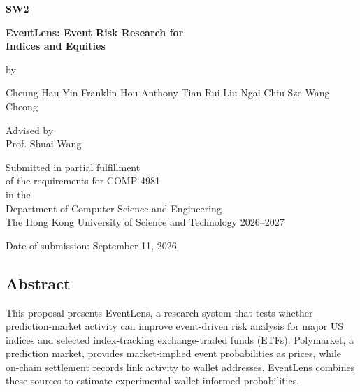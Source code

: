 \thispagestyle{empty}
\vspace*{\fill}
\begin{center}
{\fontsize{40}{48}\selectfont\bfseries SW2\par}
\end{center}
\vspace*{\fill}

\clearpage
\thispagestyle{empty}
\begin{center}
{\Huge\bfseries EventLens: Event Risk Research for\\[6pt] Indices and Equities\par}
\end{center}

\begin{center}
by

\vspace{2mm}
Cheung Hau Yin Franklin \quad Hou Anthony Tian Rui \quad Liu Ngai Chiu \quad Sze Wang Cheong
\end{center}

\begin{center}
Advised by \\
Prof. Shuai Wang
\end{center}

\begin{center}
Submitted in partial fulfillment\\
of the requirements for COMP 4981 \\[2mm]
in the\\[2mm]
Department of Computer Science and Engineering\\
The Hong Kong University of Science and Technology
2026--2027
\end{center}

\begin{center}
Date of submission: September 11, 2026
\end{center}


\clearpage
\thispagestyle{empty}
\subsection*{Abstract}
This proposal presents EventLens, a research system that tests whether prediction-market activity can improve event-driven risk analysis for major US indices and selected index-tracking exchange-traded funds (ETFs). Polymarket, a prediction market, provides market-implied event probabilities as prices, while on-chain settlement records link activity to wallet addresses. EventLens combines these sources to estimate experimental wallet-informed probabilities.

